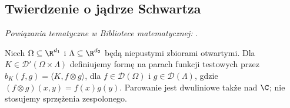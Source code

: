 \subsection{Twierdzenie o jądrze Schwartza}

\noindent\emph{Powiązania tematyczne w Bibliotece matematycznej:} .


\begin{definicja}
\label{def:kernel-pair23}
Niech $\Omega\subseteq\R^{d_1}$ i
$\Lambda\subseteq\R^{d_2}$ będą niepustymi zbiorami otwartymi.
Dla $K\in\mathcal D'(\Omega\times\Lambda)$ definiujemy
formę na parach funkcji testowych przez
$b_K(f,g)=\langle K,f\otimes g\rangle$,
dla $f\in\mathcal D(\Omega)$ i $g\in\mathcal D(\Lambda)$,
gdzie $(f\otimes g)(x,y)=f(x)g(y)$.
Parowanie jest dwuliniowe także nad $\C$; nie stosujemy
sprzężenia zespolonego.
\end{definicja}

